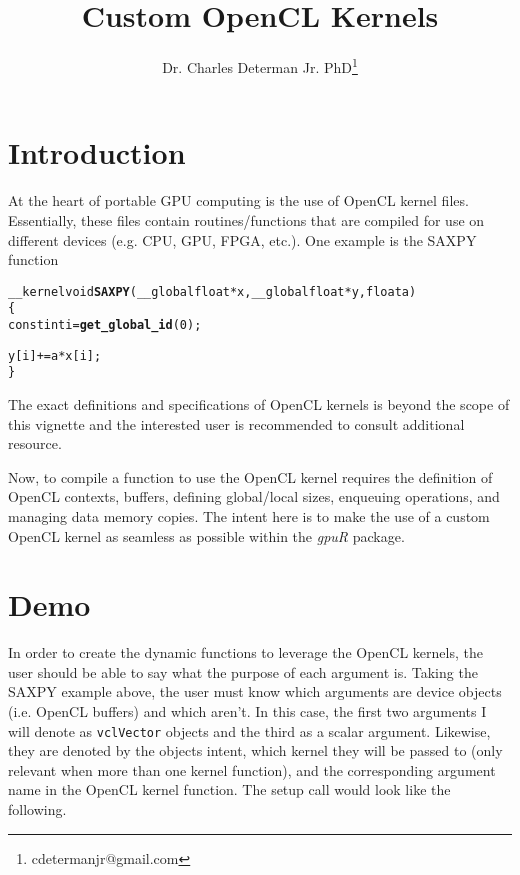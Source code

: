 \documentclass[12pt]{article}\usepackage[]{graphicx}\usepackage[]{color}
\makeatletter
\newcommand{\hlkwd}[1]{\textcolor[rgb]{0.737,0.353,0.396}{\textbf{#1}}}%
\newenvironment{kframe}{%
 \def\at@end@of@kframe{}%
 \ifinner\ifhmode%
  \def\at@end@of@kframe{\end{minipage}}%
  \begin{minipage}{\columnwidth}%
 \fi\fi%
 \def\FrameCommand##1{\hskip\@totalleftmargin \hskip-\fboxsep
 \colorbox{shadecolor}{##1}\hskip-\fboxsep
     \hskip-\linewidth \hskip-\@totalleftmargin \hskip\columnwidth}%
 \MakeFramed {\advance\hsize-\width
   \@totalleftmargin\z@ \linewidth\hsize
   \@setminipage}}%
 {\par\unskip\endMakeFramed%
 \at@end@of@kframe}
\newenvironment{knitrout}{}{} %
\newcommand{\Rpackage}[1]{\textsl{#1}}
\newcommand{\Rcode}[1]{\texttt{#1}}
\newcommand{\Rfunction}[1]{\Rcode{#1}}
\makeatother
\begin{document}
\title{Custom OpenCL Kernels}
\author{Dr. Charles Determan Jr. PhD\footnote{cdetermanjr@gmail.com}}
\newpage

\maketitle
\section{Introduction}
At the heart of portable GPU computing is the use of OpenCL kernel files.
Essentially, these files contain routines/functions that are compiled for use
on different devices (e.g. CPU, GPU, FPGA, etc.).  One example is the SAXPY
function

\begin{knitrout}
\color{fgcolor}\begin{kframe}
\begin{alltt}
__kernel void \hlkwd{SAXPY}(__global float* x, __global float* y, float a)
\{
    const int i = \hlkwd{get_global_id} (0);

    y [i] += a * x [i];
\}
\end{alltt}
\end{kframe}
\end{knitrout}

The exact definitions and specifications of OpenCL kernels is beyond the scope
of this vignette and the interested user is recommended to consult additional
resource.

Now, to compile a function to use the OpenCL kernel requires the definition of 
OpenCL contexts, buffers, defining global/local sizes, enqueuing operations, and 
managing data memory copies.  The intent here is to make the use of a custom OpenCL
kernel as seamless as possible within the \Rpackage{gpuR} package.

\newpage
\maketitle
\section{Demo}

In order to create the dynamic functions to leverage the OpenCL kernels,
the user should be able to say what the purpose of each argument is.
Taking the SAXPY example above, the user must know which arguments are device
objects (i.e. OpenCL buffers) and which aren't.  In this case, the first two
arguments I will denote as \Rfunction{vclVector} objects and the third as a scalar
argument.  Likewise, they are denoted by the objects intent, which kernel they
will be passed to (only relevant when more than one kernel function), and the
corresponding argument name in the OpenCL kernel function.  The setup call would
look like the following.
\end{document}
